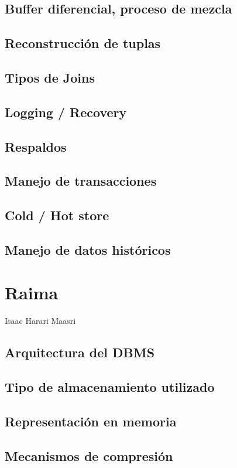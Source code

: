 \documentclass{acmart}
\begin{document}
\subsection{Buffer diferencial, proceso de mezcla}
\subsection{Reconstrucción de tuplas}
\subsection{Tipos de Joins}
\subsection{Logging / Recovery}
\subsection{Respaldos}
\subsection{Manejo de transacciones}
\subsection{Cold / Hot store}
\subsection{Manejo de datos históricos}
\newpage

\section{Raima}
Isaac Harari Maasri
\subsection{Arquitectura del DBMS}
\subsection{Tipo de almacenamiento utilizado}
\subsection{Representación en memoria}
\subsection{Mecanismos de compresión}
\end{document}
